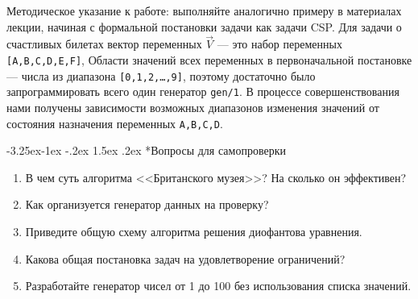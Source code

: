 \documentclass[12pt, openany, twoside]{book} %
\makeatletter
\renewcommand\subsubsection{\@startsection{subsubsection}{3}{\z@}%
                                     {-3.25ex\@plus -1ex \@minus -.2ex}%
                                     {1.5ex \@plus .2ex}%
                                     {\normalfont\normalsize\bfseries}}
\newenvironment{questions}{\subsubsection*{Вопросы для самопроверки}\begin{enumerate}}{\end{enumerate}}
\makeatother
\begin{document}
Методическое указание к работе: выполняйте аналогично примеру в материалах лекции, начиная с формальной постановки задачи как задачи CSP. Для задачи о счастливых билетах вектор переменных $\vec{V}$ --- это набор переменных \texttt{[A,B,C,D,E,F]}, Области значений всех переменных в первоначальной постановке --- числа из диапазона \texttt{[0,1,2,\ldots,9]}, поэтому достаточно было запрограммировать всего один генератор \texttt{gen/1}. В процессе совершенствования нами получены зависимости возможных диапазонов изменения значений от состояния назначения переменных \texttt{A,B,C,D}.

\begin{questions}
\item{} В чем суть алгоритма <<Британского музея>>? На сколько он эффективен?
\item{} Как организуется генератор данных на проверку?
\item{} Приведите общую схему алгоритма решения диофантова уравнения.
\item{} Какова общая постановка задач на удовлетворение ограничений?
\item{} Разработайте генератор чисел от 1 до 100 без использования списка значений.
\end{questions}
\end{document}
